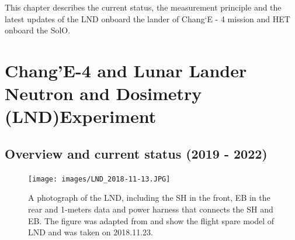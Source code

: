 This chapter describes the current status, the measurement principle and the latest updates of the \acl{LND} onboard the lander of Chang`E - 4 mission and \acl{HET} onboard the \acl{SolO}. 

\section{Chang'E-4 and Lunar Lander Neutron and Dosimetry (LND)Experiment}
\label{sec:change_4_LND}

\subsection{Overview and current status (2019 - 2022)}

\begin{figure}
    \centering
    \texttt{[image: images/LND\_2018-11-13.JPG]}
    \caption[A Photograph of the \ac{LND}]{A photograph of the \ac{LND}, including the \ac{SH} in the front, \ac{EB} in the rear and 1-meters data and power harness that connects the \ac{SH} and \ac{EB}. The figure was adapted from \citet{Wimmer2020SSRv} and show the flight spare model of LND and was taken on 2018.11.23.}
    \label{Fig:LND_instrument}
\end{figure}


